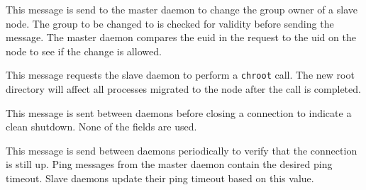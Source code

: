 \begin{description}
  \begin{reqresp}
  \norequest
  \response
  \end{reqresp}


  This message is send to the master daemon to change the group owner
  of a slave node.  The group to be changed to is checked for validity
  before sending the message.  The master daemon compares the euid in
  the request to the uid on the node to see if the change is allowed.

  \begin{reqresp}
  \response
  \end{reqresp}




  This message requests the slave daemon to perform a \texttt{chroot}
  call.  The new root directory will affect all processes migrated to
  the node after the call is completed.

  \begin{reqresp}
  \response
  \end{reqresp}


  This message is sent between daemons before closing a connection to
  indicate a clean shutdown.  None of the fields are used.





  This message is send between daemons periodically to verify that the
  connection is still up.  Ping messages from the master daemon
  contain the desired ping timeout.  Slave daemons update their ping
  timeout based on this value.


\end{description}
